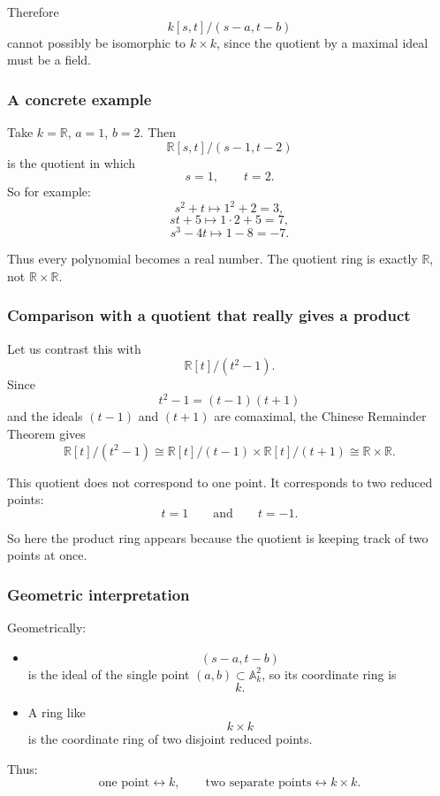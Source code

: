 \documentclass[12pt,a4paper]{article}
\theoremstyle{notespace}
\theoremstyle{definition}
\begin{document}
Therefore
\[
k[s,t]/(s-a,t-b)
\]
cannot possibly be isomorphic to \(k\times k\), since the quotient by a maximal ideal must be a field.

\subsubsection{A concrete example}

Take \(k=\mathbb{R}\), \(a=1\), \(b=2\). Then
\[
\mathbb{R}[s,t]/(s-1,t-2)
\]
is the quotient in which
\[
s=1,\qquad t=2.
\]
So for example:
\[
s^2+t \mapsto 1^2+2=3,
\]
\[
st+5 \mapsto 1\cdot 2+5=7,
\]
\[
s^3-4t \mapsto 1-8=-7.
\]

Thus every polynomial becomes a real number. The quotient ring is exactly \(\mathbb{R}\), not \(\mathbb{R}\times \mathbb{R}\).

\subsubsection{Comparison with a quotient that really gives a product}

Let us contrast this with
\[
\mathbb{R}[t]/(t^2-1).
\]
Since
\[
t^2-1=(t-1)(t+1)
\]
and the ideals \((t-1)\) and \((t+1)\) are comaximal, the Chinese Remainder Theorem gives
\[
\mathbb{R}[t]/(t^2-1)\cong \mathbb{R}[t]/(t-1)\times \mathbb{R}[t]/(t+1)
\cong \mathbb{R}\times\mathbb{R}.
\]

This quotient does not correspond to one point. It corresponds to two reduced points:
\[
t=1\qquad \text{and} \qquad t=-1.
\]

So here the product ring appears because the quotient is keeping track of two points at once.

\subsubsection{Geometric interpretation}

Geometrically:

\begin{itemize}
	\item
	\[
	(s-a,t-b)
	\]
	is the ideal of the single point \((a,b)\subset \mathbb{A}^2_k\), so its coordinate ring is
	\[
	k.
	\]
	
	\item
	A ring like
	\[
	k\times k
	\]
	is the coordinate ring of two disjoint reduced points.
\end{itemize}

Thus:
\[
\text{one point} \longleftrightarrow k,
\qquad
\text{two separate points} \longleftrightarrow k\times k.
\]
\end{document}
